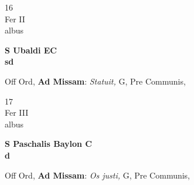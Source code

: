 \documentclass[10pt, openany]{book}
\begin{document}
        \begin{center}
            \begin{minipage}{3.5in}
                \vspace{2em}
                \begin{minipage}{0.5in}
                    {\Huge 16} \\
                    {\normalsize Fer II} \\
                    {\normalsize albus}
                \end{minipage}
                \begin{minipage}{3.0in}
                    \textbf{ \large S Ubaldi EC \\
                    \textnormal{\normalsize sd}} \\ 
                \end{minipage}
                \begin{justify}Off Ord, \textbf{Ad Missam}: \textit{Statuit,} G, Pre Communis,  
                \end{justify}
            \end{minipage}
        \end{center}
    
        \begin{center}
            \begin{minipage}{3.5in}
                \vspace{2em}
                \begin{minipage}{0.5in}
                    {\Huge 17} \\
                    {\normalsize Fer III} \\
                    {\normalsize albus}
                \end{minipage}
                \begin{minipage}{3.0in}
                    \textbf{ \large S Paschalis Baylon C \\
                    \textnormal{\normalsize d}} \\ 
                \end{minipage}
                \begin{justify}Off Ord, \textbf{Ad Missam}: \textit{Os justi,} G, Pre Communis,  
                \end{justify}
            \end{minipage}
        \end{center}
    
\end{document}
